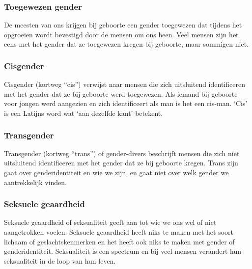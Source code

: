 \documentclass[12pt,openany]{book}
\begin{document}
\subsubsection*{Toegewezen gender}

De meesten van ons krijgen bij geboorte een gender toegewezen dat tijdens het opgroeien wordt bevestigd door de mensen om ons heen. Veel mensen zijn het eens met het gender dat ze toegewezen kregen bij geboorte, maar sommigen niet.  

\subsubsection*{Cisgender}

Cisgender (kortweg “cis”) verwijst naar mensen die zich uitsluitend identificeren met het gender dat ze bij geboorte werd toegewezen. Als iemand bij geboorte voor jongen werd aangezien en zich identificeert als man is het een cis-man. ‘Cis’ is een Latijns word wat ‘aan dezelfde kant’ betekent. 

\begin{figure}[h]
    \centering
\end{figure}

\subsubsection*{Transgender} 

Transgender (kortweg “trans”) of gender-divers beschrijft mensen die zich niet uitsluitend identificeren met het gender dat ze bij geboorte kregen. Trans zijn gaat over genderidentiteit en wie we zijn, en gaat niet over welk gender we aantrekkelijk vinden.

\subsubsection*{Seksuele geaardheid} 

Seksuele geaardheid of seksualiteit geeft aan tot wie we ons wel of niet aangetrokken voelen. Seksuele geaardheid heeft niks te maken met het soort lichaam of geslachtskenmerken en het heeft ook niks te maken met gender of genderidentiteit. Seksualiteit is een spectrum en bij veel mensen verandert hun seksualiteit in de loop van hun leven.
\end{document}
